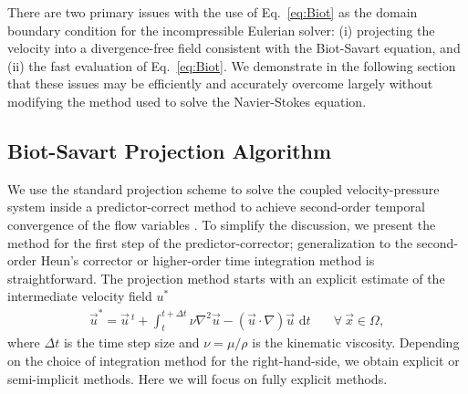 \documentclass[final,1p,times]{elsarticle}
\begin{document}
There are two primary issues with the use of Eq.~\ref{eq:Biot} as the domain boundary condition for the incompressible Eulerian solver: (i) projecting the velocity into a divergence-free field consistent with the Biot-Savart equation, and (ii) the fast evaluation of Eq.~\ref{eq:Biot}. We demonstrate in the following section that these issues may be efficiently and accurately overcome largely without modifying the method used to solve the Navier-Stokes equation.

\subsection{Biot-Savart Projection Algorithm}\label{sec:Biot_projection}

We use the standard projection scheme \cite{Chorin1967} to solve the coupled velocity-pressure system inside a predictor-correct method to achieve second-order temporal convergence of the flow variables \cite{Lauber2022}. 
To simplify the discussion, we present the method for the first step of the predictor-corrector; generalization to the second-order Heun's corrector or higher-order time integration method is straightforward. The projection method starts with an explicit estimate of the intermediate velocity field $u^*$
\begin{align}\label{eq:intermediate}
    \vec{u}^* = \vec{u}\,^t + \int_{t}^{t+\Delta t}\nu\nabla^2\vec{u} -\left(\vec{u}\cdot\nabla\right)\vec{u}\text{ d}t &\quad\forall\ \vec{x}\in\Omega,
\end{align}
where $\Delta t$ is the time step size and $\nu=\mu/\rho$ is the kinematic viscosity. Depending on the choice of integration method for the right-hand-side, we obtain explicit or semi-implicit methods. Here we will focus on fully explicit methods. 


\end{document}
